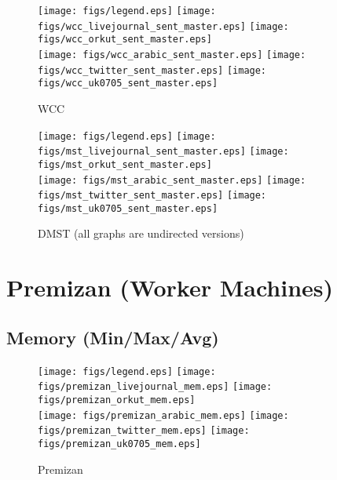 \documentclass{article}
\newcommand{\bline}[1][1]{\vspace{#1\baselineskip}}
\begin{document}
\begin{figure}[!h]
  \bline[3.5]
  \centering
  \texttt{[image: figs/legend.eps]}\hspace{3em}%
  \texttt{[image: figs/wcc\_livejournal\_sent\_master.eps]}\hspace{1em}%
  \texttt{[image: figs/wcc\_orkut\_sent\_master.eps]}\\
  \texttt{[image: figs/wcc\_arabic\_sent\_master.eps]}\hspace{1em}%
  \texttt{[image: figs/wcc\_twitter\_sent\_master.eps]}\hspace{1em}%
  \texttt{[image: figs/wcc\_uk0705\_sent\_master.eps]}
  \caption{WCC}
\end{figure}

\begin{figure}[!h]
  \bline[3.5]
  \centering
  \texttt{[image: figs/legend.eps]}\hspace{3em}%
  \texttt{[image: figs/mst\_livejournal\_sent\_master.eps]}\hspace{1em}%
  \texttt{[image: figs/mst\_orkut\_sent\_master.eps]}\\
  \texttt{[image: figs/mst\_arabic\_sent\_master.eps]}\hspace{1em}%
  \texttt{[image: figs/mst\_twitter\_sent\_master.eps]}\hspace{1em}%
  \texttt{[image: figs/mst\_uk0705\_sent\_master.eps]}
  \caption{DMST (all graphs are undirected versions)}
\end{figure}

\pagebreak
\section{Premizan (Worker Machines)}
\label{sec:premizan}
\subsection{Memory (Min/Max/Avg)}
\begin{figure}[!h]
  \centering
  \texttt{[image: figs/legend.eps]}\hspace{3em}%
  \texttt{[image: figs/premizan\_livejournal\_mem.eps]}\hspace{1em}%
  \texttt{[image: figs/premizan\_orkut\_mem.eps]}\\
  \texttt{[image: figs/premizan\_arabic\_mem.eps]}\hspace{1em}%
  \texttt{[image: figs/premizan\_twitter\_mem.eps]}\hspace{1em}%
  \texttt{[image: figs/premizan\_uk0705\_mem.eps]}
  \caption{Premizan}
\end{figure}
\end{document}

